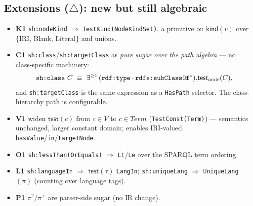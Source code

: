 \documentclass[11pt]{article}
\newcommand{\Term}{\mathit{Term}}
\newcommand{\Val}{V}
\newcommand{\test}{\mathsf{test}}
\newcommand{\kind}{\mathsf{kind}}
\newcommand{\Star}{{*}}
\newcommand{\code}[1]{\texttt{#1}}
\theoremstyle{definition}
\begin{document}
\subsection{Extensions ($\triangle$): new but still algebraic}
\begin{itemize}[leftmargin=1.4em]
  \item \textbf{K1} \code{sh:nodeKind} $\Rightarrow$ \code{TestKind(NodeKindSet)},
  a primitive on $\kind(v)$ over $\{$IRI, Blank, Literal$\}$ and unions.
  \item \textbf{C1} \code{sh:class}/\code{sh:targetClass} as \emph{pure sugar
  over the path algebra} --- no class-specific machinery:
  \[
  \text{\code{sh:class} } C \ \equiv\ \exists^{\geq1}\,(\code{rdf:type}\cdot\code{rdfs:subClassOf}^{\Star}).\test_{\mathrm{node}}(C),
  \]
  and \code{sh:targetClass} is the same expression as a \code{HasPath} selector.
  The class-hierarchy path is configurable.
  \item \textbf{V1} widen $\test(c)$ from $c\in\Val$ to $c\in\Term$
  (\code{TestConst(Term)}) --- semantics unchanged, larger constant domain;
  enables IRI-valued \code{hasValue}/\code{in}/\code{targetNode}.
  \item \textbf{O1} \code{sh:lessThan(OrEquals)} $\Rightarrow$
  \code{Lt}/\code{Le} over the SPARQL term ordering.
  \item \textbf{L1} \code{sh:languageIn} $\Rightarrow$ $\test(\tau)$ \code{LangIn};
  \code{sh:uniqueLang} $\Rightarrow$ \code{UniqueLang}$(\pi)$ (counting over
  language tags).
  \item \textbf{P1} $\pi^{?}$/$\pi^{+}$ are parser-side sugar (no IR change).
\end{itemize}
\end{document}
